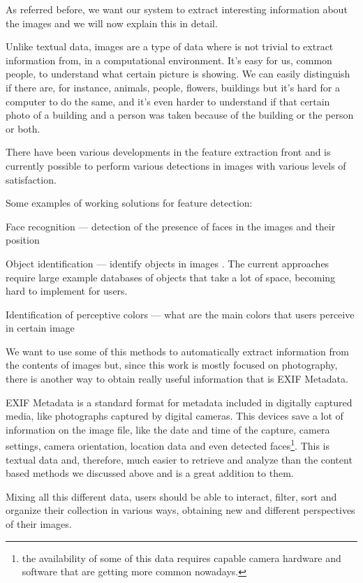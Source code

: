 
As referred before, we want our system to extract interesting information about the images and we will now explain this in detail.


Unlike textual data, images are a type of data where is not trivial to extract information from, in a computational environment. It's easy for us, common people, to understand what certain picture is showing. We can easily distinguish if there are, for instance, animals, people, flowers, buildings but it's hard for a computer to do the same, and it's even harder to understand if that certain photo of a building and a person was taken because of the building or the person or both.

There have been various developments in the feature extraction front  and is currently possible to perform various detections in images with various levels of satisfaction.

Some examples of working solutions for feature detection:

\begin{myitemize}
	\item{Face recognition — detection of the presence of faces in the images and their position }
	\item{Object identification — identify objects in images . The current approaches require large example databases of objects that take a lot of space, becoming hard to implement for users.}
	\item{Identification of perceptive colors — what are the main colors that users perceive in certain image }
	\item{}
\end{myitemize}

We want to use some of this methods to automatically extract information from the contents of images but, since this work is mostly focused on photography, there is another way to obtain really useful information that is EXIF Metadata.

EXIF Metadata is a standard format for metadata included in digitally captured media, like photographs captured by digital cameras. This devices save a lot of information on the image file, like the date and time of the capture, camera settings, camera orientation, location data and even detected faces\footnote{the availability of some of this data requires capable camera hardware and software that are getting more common nowadays.}. This is textual data and, therefore, much easier to retrieve and analyze than the content based methods we discussed above and is a great addition to them.

Mixing all this different data, users should be able to interact, filter, sort and organize their collection in various ways, obtaining new and different perspectives of their images.




